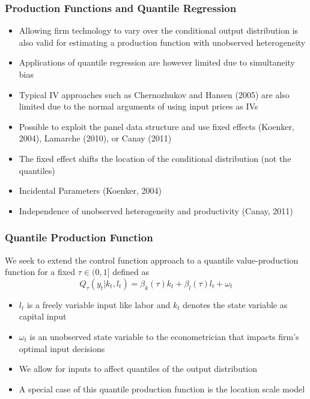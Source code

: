 \documentclass{beamer}
\begin{document}
\begin{frame}
\begin{itemize}
\begin{frame}
\frametitle{Production Functions and Quantile Regression}
\begin{itemize}
	\item Allowing firm technology to vary over the conditional output distribution is also valid for estimating a production function with unobserved heterogeneity
	\item Applications of quantile regression are however limited due to simultaneity bias
	\item Typical IV approaches such as Chernozhukov and Hansen (2005) are also limited due to the normal arguments of using input prices as IVs
	\item Possible to exploit the panel data structure and use fixed effects (Koenker, 2004), Lamarche (2010), or Canay (2011)
	\item The fixed effect shifts the location of the conditional distribution (not the quantiles)
	\item Incidental Parameters (Koenker, 2004)
	\item Independence of unobserved heterogeneity and productivity (Canay, 2011)
	
\end{itemize}
\end{frame}



\begin{frame}
\frametitle{Quantile Production Function}
We seek to extend the control function approach to a quantile value-production function for a fixed $\tau\in(0,1]$ defined as
\begin{equation}
	Q_{\tau}(y_{t}|k_{t}, l_{t})=\beta_{k}(\tau)k_{t}+\beta_{l}(\tau)l_{t}+\omega_{t}
\end{equation}

\begin{itemize}
	\item $l_{t}$ is a freely variable input like labor and $k_{t}$ denotes the state variable as capital input
	\item $\omega_{t}$ is an unobserved state variable to the econometrician that impacts firm's optimal input decisions
	\item We allow for inputs to affect quantiles of the output distribution
	\item A special case of this quantile production function is the location scale model
	

\end{itemize}
\end{frame}
\end{itemize}
\end{frame}
\end{document}
